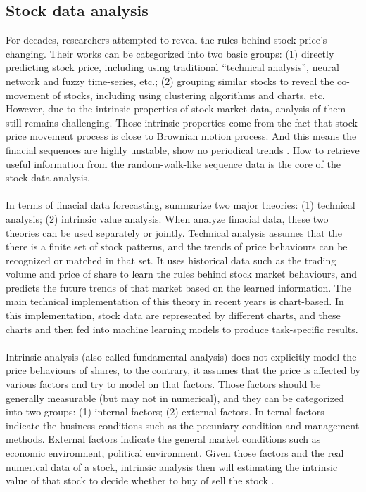 \subsection{Stock data analysis}
For decades, researchers attempted to reveal the rules behind stock price's changing. Their works can be categorized into two basic groups: (1) directly predicting stock price, including using traditional ``technical analysis'', neural network and fuzzy time-series, etc.; (2) grouping similar stocks to reveal the co-movement of stocks, including using clustering algorithms and charts, etc. However, due to the intrinsic properties of stock market data, analysis of them still remains challenging. Those intrinsic properties come from the fact that stock price movement process is close to Brownian motion process. And this means the finacial sequences are highly unstable, show no periodical trends \cite{tsay2005analysis}. How to retrieve useful information from the random-walk-like sequence data is the core of the stock data analysis. \\
\\In terms of finacial data forecasting, \cite{kumar2015use} summarize two major theories: (1) technical analysis; (2) intrinsic value analysis. When analyze finacial data, these two theories can be used separately or jointly. Technical analysis assumes that the there is a finite set of stock patterns, and the trends of price behaviours can be recognized or matched in that set. It uses historical data such as the trading volume and price of share to learn the rules behind stock market behaviours, and predicts the future trends of that market based on the learned information. The main technical implementation of this theory in recent years is chart-based. In this implementation, stock data are represented by different charts, and these charts and then fed into machine learning models to produce task-specific results. \\
\\Intrinsic analysis (also called fundamental analysis) does not explicitly model the price behaviours of shares, to the contrary, it assumes that the price is affected by various factors and try to model on that factors. Those factors should be generally measurable (but may not in numerical), and they can be categorized into two groups: (1) internal factors; (2) external factors. In ternal factors indicate the business conditions such as the pecuniary condition and management methods. External factors indicate the general market conditions such as economic environment, political environment. Given those factors and the real numerical data of a stock, intrinsic analysis then will estimating the intrinsic value of that stock to decide whether to buy of sell the stock \cite{kumar2015use}.



